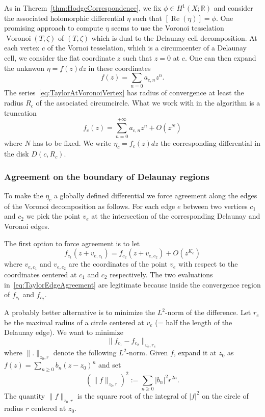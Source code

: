 \documentclass[a4paper,12pt]{article}
\def\bR{\mathbb{R}}
\def\Re{\operatorname{Re}}
\def\Voronoi{\operatorname{Voronoi}}
\begin{document}
As in Therem~\ref{thm:HodgeCorrespondence}, we fix $\phi \in H^1(X; \bR)$ and consider
the associated holomorphic differential $\eta$ such that $[\Re(\eta)] = \phi$.
One promising approach to compute $\eta$ seems to use the Voronoi tesselation $\Voronoi(T,
\zeta)$ of $(T, \zeta)$ which is dual to the Delaunay cell decomposition. At
each vertex $c$ of the Vornoi tesselation, which is a circumcenter of a Delaunay
cell, we consider the flat coordinate $z$ such that $z=0$ at $c$. One can then
expand the unknwon $\eta = f(z) dz$ in these coordinates
\begin{equation}
\label{eq:TaylorAtVoronoiVertex}
f(z) = \sum_{n=0} a_{c,n} z^{n}.
\end{equation}
The series~\eqref{eq:TaylorAtVoronoiVertex} has radius of convergence at least the
radius $R_c$ of the associated circumcircle. What we work with in the algorithm
is a truncation
\begin{equation}
\label{eq:truncatedTaylorAtVoronoiVertex}
f_c(z) = \sum_{n=0}^{+\infty} a_{c,n} z^{n} + O(z^{N})
\end{equation}
where $N$ has to be fixed. We write $\eta_c = f_c(z) dz$ the corresponding
differential in the disk $D(c, R_c)$.

\subsubsection{Agreement on the boundary of Delaunay regions}
To make the $\eta_c$ a globally defined differential we force agreement along the
edges of the Voronoi decomposition as follows. For each edge $e$ between two vertices
$c_1$ and $c_2$ we pick the point $v_e$ at the intersection of the corresponding
Delaunay and Voronoi edges.

The first option to force agreement is to let
\begin{equation}
\label{eq:TaylorEdgeAgreement}
f_{c_1}(z + v_{e,c_1}) = f_{c_2}(z + v_{e,c_2}) + O(z^{K_e})
\end{equation}
where $v_{e,c_1}$ and $v_{e,c_2}$ are the coordinates of the point $v_e$ with
respect to the coordinates centered at $c_1$ and $c_2$ respectively. The two
evaluations in~\eqref{eq:TaylorEdgeAgreement} are legitimate because inside
the convergence region of $f_{c_1}$ and $f_{c_2}$.

A probably better alternative is to minimize the $L^2$-norm of the difference.
Let $r_e$ be the maximal radius of a circle centered at $v_e$ (= half the
length of the Delaunay edge). We want to minimize
\[
\|f_{c_1} - f_{c_2} \|_{v_e, r_e}
\]
where $\|.\|_{z_0,r}$ denote the following $L^2$-norm. Given $f$, expand it
at $z_0$ as $f(z) = \sum_{n \ge 0} b_n (z - z_0)^n$ and set
\[
(\|f\|_{z_0,r})^2 := \sum_{n \ge 0} |b_n|^2 r^{2n}.
\]
The quantity $\|f\|_{z_0, r}$ is the square root of the integral of $|f|^2$
on the circle of radius $r$ centered at $z_0$.
\end{document}
